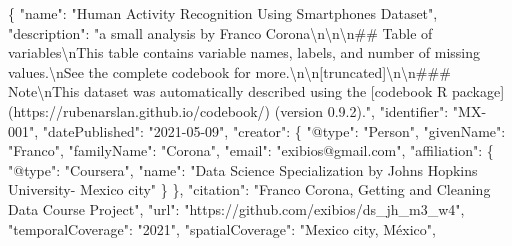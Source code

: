 \documentclass[
]{article}
\newenvironment{Shaded}{\begin{snugshade}}{\end{snugshade}}
\newcommand{\CharTok}[1]{\textcolor[rgb]{0.31,0.60,0.02}{#1}}
\newcommand{\DataTypeTok}[1]{\textcolor[rgb]{0.13,0.29,0.53}{#1}}
\newcommand{\FunctionTok}[1]{\textcolor[rgb]{0.00,0.00,0.00}{#1}}
\newcommand{\StringTok}[1]{\textcolor[rgb]{0.31,0.60,0.02}{#1}}
\begin{document}
\begin{Shaded}
\begin{Highlighting}[]
\FunctionTok{\{}
  \DataTypeTok{"name"}\FunctionTok{:} \StringTok{"Human Activity Recognition Using Smartphones Dataset"}\FunctionTok{,}
  \DataTypeTok{"description"}\FunctionTok{:} \StringTok{"a small analysis by Franco Corona}\CharTok{\textbackslash{}n\textbackslash{}n\textbackslash{}n}\StringTok{\#\# Table of variables}\CharTok{\textbackslash{}n}\StringTok{This table contains variable names, labels, and number of missing values.}\CharTok{\textbackslash{}n}\StringTok{See the complete codebook for more.}\CharTok{\textbackslash{}n\textbackslash{}n}\StringTok{[truncated]}\CharTok{\textbackslash{}n\textbackslash{}n}\StringTok{\#\#\# Note}\CharTok{\textbackslash{}n}\StringTok{This dataset was automatically described using the [codebook R package](https://rubenarslan.github.io/codebook/) (version 0.9.2)."}\FunctionTok{,}
  \DataTypeTok{"identifier"}\FunctionTok{:} \StringTok{"MX{-}001"}\FunctionTok{,}
  \DataTypeTok{"datePublished"}\FunctionTok{:} \StringTok{"2021{-}05{-}09"}\FunctionTok{,}
  \DataTypeTok{"creator"}\FunctionTok{:} \FunctionTok{\{}
    \DataTypeTok{"@type"}\FunctionTok{:} \StringTok{"Person"}\FunctionTok{,}
    \DataTypeTok{"givenName"}\FunctionTok{:} \StringTok{"Franco"}\FunctionTok{,}
    \DataTypeTok{"familyName"}\FunctionTok{:} \StringTok{"Corona"}\FunctionTok{,}
    \DataTypeTok{"email"}\FunctionTok{:} \StringTok{"exibios@gmail.com"}\FunctionTok{,}
    \DataTypeTok{"affiliation"}\FunctionTok{:} \FunctionTok{\{}
      \DataTypeTok{"@type"}\FunctionTok{:} \StringTok{"Coursera"}\FunctionTok{,}
      \DataTypeTok{"name"}\FunctionTok{:} \StringTok{"Data Science Specialization by Johns Hopkins University{-} Mexico city"}
    \FunctionTok{\}}
  \FunctionTok{\},}
  \DataTypeTok{"citation"}\FunctionTok{:} \StringTok{"Franco Corona, Getting and Cleaning Data Course Project"}\FunctionTok{,}
  \DataTypeTok{"url"}\FunctionTok{:} \StringTok{"https://github.com/exibios/ds\_jh\_m3\_w4"}\FunctionTok{,}
  \DataTypeTok{"temporalCoverage"}\FunctionTok{:} \StringTok{"2021"}\FunctionTok{,}
  \DataTypeTok{"spatialCoverage"}\FunctionTok{:} \StringTok{"Mexico city, México"}\FunctionTok{,}

\end{Highlighting}
\end{Shaded}
\end{document}
